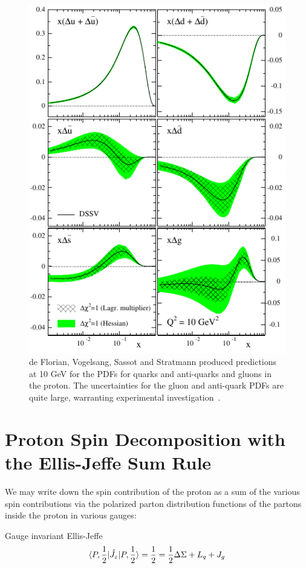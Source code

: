 \begin{figure}[ht]
  \centering
  \includegraphics[width=0.8\linewidth]{./figures/polarized_pdfs_dssv.pdf}
  \caption{
    de Florian, Vogelsang, Sassot and Stratmann produced predictions at 10 GeV
    for the PDFs for quarks and anti-quarks and gluons in the proton. The
    uncertainties for the gluon and anti-quark PDFs are quite large, warranting
    experimental investigation~\cite{DeFlorian2009}.
  }
  \label{fig:polarized_pdfs_2}
\end{figure}

\clearpage
\section{Proton Spin Decomposition with the Ellis-Jeffe Sum Rule }

We may write down the spin contribution of the proton as a sum of the various
spin contributions via the polarized parton distribution functions of the
partons inside the proton in various gauges:

{\noindent}Gauge invariant Ellis-Jeffe
\begin{equation}
  \braket{P,{1\over2}|\hat{J_z}|P,{1\over2}}  
 = {1\over2} = {{1\over2}\Delta \Sigma +L_q+J_g}
\label{eq:ellis_jeffe_sum}
\end{equation}

